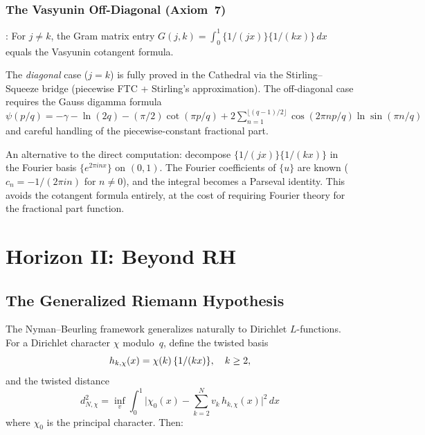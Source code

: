 \documentclass[11pt,a4paper]{article}
\begin{document}
\subsubsection{The Vasyunin Off-Diagonal (Axiom~7)}

\begin{axiombox}
: For $j \neq k$, the Gram matrix
entry $G(j,k) = \int_0^1 \{1/(jx)\}\{1/(kx)\}\,dx$ equals the
Vasyunin cotangent formula.
\end{axiombox}

The \emph{diagonal} case ($j = k$) is fully proved in the Cathedral via
the Stirling--Squeeze bridge (piecewise FTC + Stirling's approximation).
The off-diagonal case requires the Gauss digamma formula
$\psi(p/q) = -\gamma - \ln(2q) - (\pi/2)\cot(\pi p/q) +
2\sum_{n=1}^{\lfloor(q-1)/2\rfloor} \cos(2\pi np/q)\ln\sin(\pi n/q)$
and careful handling of the piecewise-constant fractional part.

\begin{direction}
An alternative to the direct computation: decompose $\{1/(jx)\}\{1/(kx)\}$
in the Fourier basis $\{e^{2\pi inx}\}$ on $(0,1)$. The Fourier
coefficients of $\{u\}$ are known ($c_n = -1/(2\pi in)$ for $n \neq 0$),
and the integral becomes a Parseval identity. This avoids the cotangent
formula entirely, at the cost of requiring Fourier theory for the
fractional part function.
\end{direction}

\section{Horizon II: Beyond RH}
\label{sec:generalization}

\subsection{The Generalized Riemann Hypothesis}

The Nyman--Beurling framework generalizes naturally to Dirichlet
$L$-functions. For a Dirichlet character $\chi$ modulo~$q$, define the
twisted basis
\[
  h_{k,\chi}(x) = \chi(k)\,\{1/(kx)\}, \quad k \ge 2,
\]
and the twisted distance
\[
  d_{N,\chi}^2 = \inf_v \int_0^1
    \biggl|\chi_0(x) - \sum_{k=2}^N v_k\,h_{k,\chi}(x)\biggr|^2\,dx
\]
where $\chi_0$ is the principal character. Then:
\end{document}
